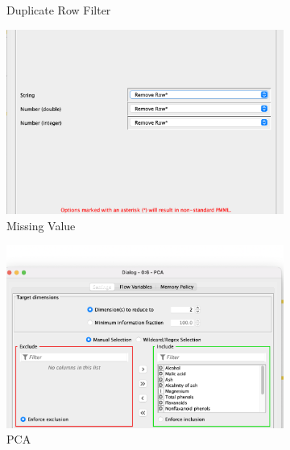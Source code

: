 \documentclass[11pt]{article}
\begin{document}
\begin{figure}[H]
\begin{subfigure}{0.4\textwidth}
					\caption{Duplicate Row Filter}
					\label{fig:third}
				\end{subfigure}	
				\begin{subfigure}{0.4\textwidth}
					\includegraphics[width=\textwidth]{res/t1/t11/t11-missing-values-conf}
					\caption{Missing Value}
					\label{fig:first}
				\end{subfigure}
				\hfill
				\begin{subfigure}{0.4\textwidth}
					\includegraphics[width=\textwidth]{res/t1/t11/t11-PCA-conf}
					\caption{PCA}
					\label{fig:second}
				\end{subfigure}
				\hfill
				\begin{subfigure}{0.4\textwidth}

\end{subfigure}
\end{figure}
\end{document}
